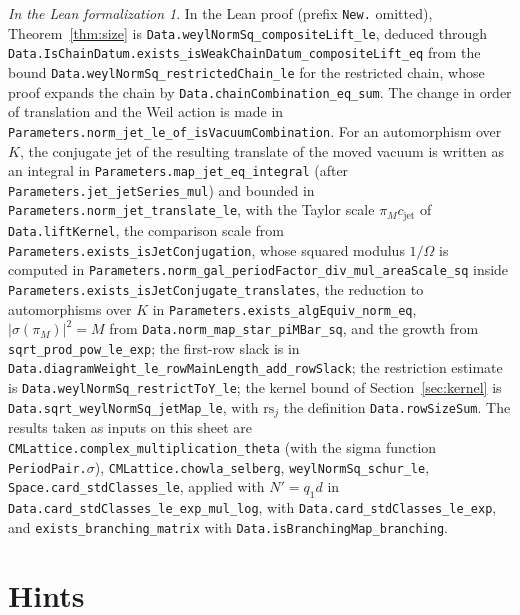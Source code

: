 \documentclass[reqno]{amsart}
\theoremstyle{definition}
\theoremstyle{plain}
\theoremstyle{remark}
\newtheorem*{leanremark}{In the Lean formalization}
\newcommand{\tl}[1]{\texttt{#1}}
\newcommand{\rs}{\mathrm{rs}}
\begin{document}
\begin{leanremark}
In the Lean proof \cite{GL} (prefix \tl{New.} omitted), Theorem~\ref{thm:size} is \tl{Data.weylNormSq\_compositeLift\_le}, deduced through \tl{Data.IsChainDatum.exists\_isWeakChainDatum\_compositeLift\_eq} from the bound \tl{Data.weylNormSq\_restrictedChain\_le} for the restricted chain, whose proof expands the chain by \tl{Data.chainCombination\_eq\_sum}.  The change in order of translation and the Weil action is made in \tl{Parameters.norm\_jet\_le\_of\_isVacuumCombination}.  For an automorphism over \(K\), the conjugate jet of the resulting translate of the moved vacuum is written as an integral in \tl{Parameters.map\_jet\_eq\_integral} (after \tl{Parameters.jet\_jetSeries\_mul}) and bounded in \tl{Parameters.norm\_jet\_translate\_le}, with the Taylor scale \(\pi_M c_{\mathrm{jet}}\) of \tl{Data.liftKernel}, the comparison scale from \tl{Parameters.exists\_isJetConjugation}, whose squared modulus \(1/\Omega\) is computed in \tl{Parameters.norm\_gal\_periodFactor\_div\_mul\_areaScale\_sq} inside \tl{Parameters.exists\_isJetConjugate\_translates}, the reduction to automorphisms over \(K\) in \tl{Parameters.exists\_algEquiv\_norm\_eq}, \(\lvert\sigma(\pi_M)\rvert^2 = M\) from \tl{Data.norm\_map\_star\_piMBar\_sq}, and the growth from \tl{sqrt\_prod\_pow\_le\_exp}; the first-row slack is in \tl{Data.diagramWeight\_le\_rowMainLength\_add\_rowSlack}; the restriction estimate is \tl{Data.weylNormSq\_restrictToY\_le}; the kernel bound of Section~\ref{sec:kernel} is \tl{Data.sqrt\_weylNormSq\_jetMap\_le}, with \(\rs_j\) the definition \tl{Data.rowSizeSum}.  The results taken as inputs on this sheet are \tl{CMLattice.complex\_multiplication\_theta} (with the sigma function \tl{PeriodPair.}\(\sigma\)), \tl{CMLattice.chowla\_selberg}, \tl{weylNormSq\_schur\_le}, \tl{Space.card\_stdClasses\_le}, applied with \(N' = q_1d\) in \tl{Data.card\_stdClasses\_le\_exp\_mul\_log}, with \tl{Data.card\_stdClasses\_le\_exp}, and \tl{exists\_branching\_matrix} with \tl{Data.isBranchingMap\_branching}.
\end{leanremark}

\section*{Hints}
\end{document}
